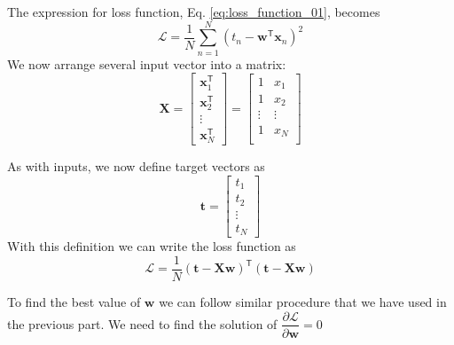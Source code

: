 The expression for loss function, Eq. \eqref{eq:loss_function_01}, becomes
\begin{equation}
\mathcal{L} = \frac{1}{N} \sum_{n=1}^{N} \left( t_{n} - \mathbf{w}^{\mathsf{T}}
\mathbf{x}_{n} \right)^2
\label{eq:loss_function_02}
\end{equation}
%
We now arrange several input vector into a matrix:
%
\begin{equation*}
\mathbf{X} = \begin{bmatrix}
\mathbf{x}^{\mathsf{T}}_{1} \\
\mathbf{x}^{\mathsf{T}}_{2} \\
\vdots \\
\mathbf{x}^{\mathsf{T}}_{N}
\end{bmatrix} =
\begin{bmatrix}
1 & x_{1} \\
1 & x_{2} \\
\vdots & \vdots \\
1 & x_{N} \\
\end{bmatrix}
\end{equation*}

As with inputs, we now define target vectors as
\begin{equation}
\mathbf{t} = \begin{bmatrix}
t_1 \\
t_2 \\
\vdots \\
t_N
\end{bmatrix}
\end{equation}
%
With this definition we can write the loss function as
\begin{equation}
\mathcal{L} = \frac{1}{N} \left( \mathbf{t} - \mathbf{Xw} \right)^{\mathsf{T}}
\left( \mathbf{t} - \mathbf{Xw} \right)
\end{equation}

To find the best value of $\mathbf{w}$ we can follow similar procedure that we have used
in the previous part. We need to find the solution of
$\dfrac{\partial \mathcal{L}}{\partial \mathbf{w}} = 0$

